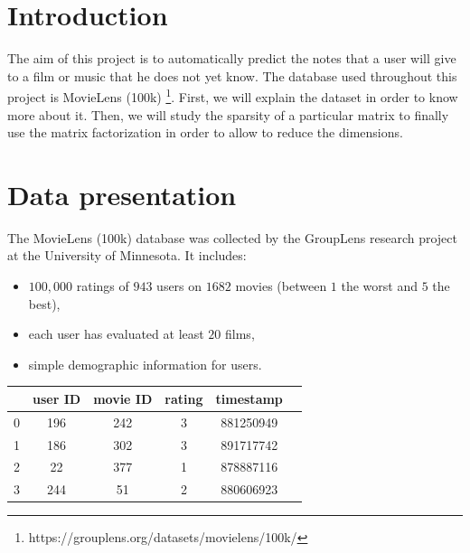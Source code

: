 \documentclass{article}
\begin{document}
\section*{Introduction}

The aim of this project is to automatically predict the notes that a user will give to a film or music that he does not yet know. The database used throughout this project is MovieLens (100k) \footnote{https://grouplens.org/datasets/movielens/100k/}.
First, we will explain the dataset in order to know more about it. Then, we will study the sparsity of a particular matrix to finally use the matrix factorization in order to allow to reduce the dimensions.

\section{Data presentation}
The MovieLens (100k) database was collected by the GroupLens research project at the University of Minnesota. It includes:
\begin{itemize}
    \item $100,000$ ratings of $943$ users on $1682$ movies (between $1$ the worst and $5$ the best),
    \item each user has evaluated at least $20$ films,
    \item simple demographic information for users.
\end{itemize}

\begin{center}
    \begin{tabular}{|c|c|c|c|c|c|}
    \hline
         & user ID & movie ID & rating & timestamp \\
         \hline \hline
         0 & 196 & 242 & 3 & 881250949\\
         1 & 186 & 302 & 3 & 891717742\\
         2 & 22 & 377 & 1 & 878887116\\
         3 & 244 & 51 & 2 & 880606923\\
         \hline
    \end{tabular}
\end{center}
\end{document}
